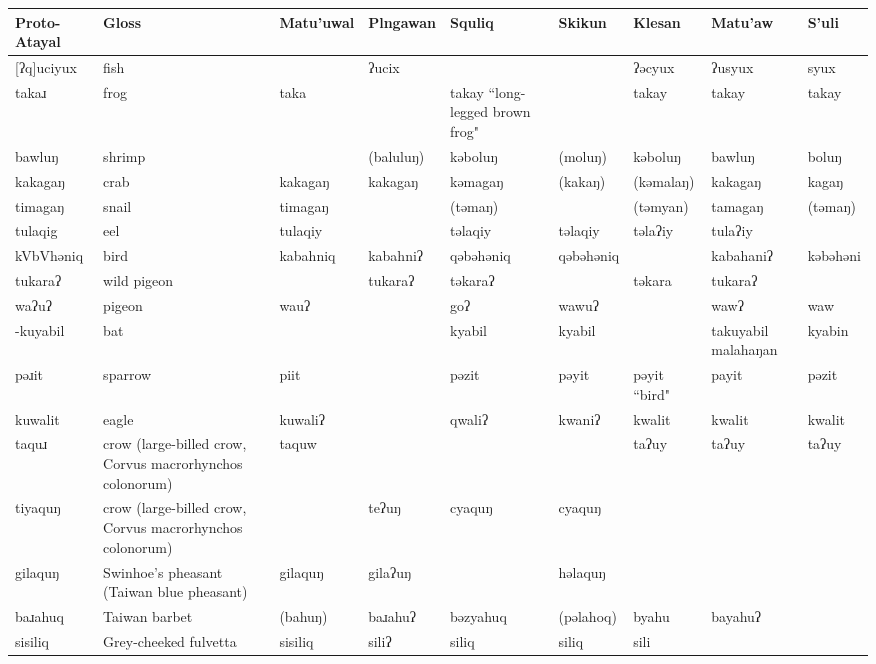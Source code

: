 
\begin{landscape}

\begin{longtable}{*{9}{p{}}}
Proto-Atayal & Gloss & Matu'uwal & Plngawan & Squliq & Skikun & Klesan & Matu'aw & S'uli\\\hline\endhead
\text{*}[ʔq]uciyux & fish &  & ʔucix &  &  & ʔəcyux & ʔusyux & syux\\
\text{*}takaɹ & frog & taka &  & takay ``long-legged brown frog" &  & takay & takay & takay\\
\text{*}bawluŋ & shrimp &  & (baluluŋ) & kəboluŋ & (moluŋ) & kəboluŋ & bawluŋ & boluŋ\\
\text{*}kakagaŋ & crab & kakagaŋ & kakagaŋ & kəmagaŋ & (kakaŋ) & (kəmalaŋ) & kakagaŋ & kagaŋ\\
\text{*}timagaŋ & snail & timagaŋ &  & (təmaŋ) &  & (təmyan) & tamagaŋ & (təmaŋ)\\
\text{*}tulaqig & eel & tulaqiy &  & təlaqiy & təlaqiy & təlaʔiy & tulaʔiy & \\
\text{*}kVbVhəniq & bird & kabahniq & kabahniʔ & qəbəhəniq & qəbəhəniq &  & kabahaniʔ & kəbəhəni\\
\text{*}tukaraʔ & wild pigeon &  & tukaraʔ & təkaraʔ &  & təkara & tukaraʔ & \\
\text{*}waʔuʔ & pigeon & wauʔ &  & goʔ & wawuʔ &  & wawʔ & waw\\
\text{*}-kuyabil & bat &  &  & kyabil & kyabil &  & takuyabil malahaŋan & kyabin\\
\text{*}pəɹit & sparrow & piit &  & pəzit & pəyit & pəyit ``bird" & payit & pəzit\\
\text{*}kuwalit & eagle & kuwaliʔ &  & qwaliʔ & kwaniʔ & kwalit & kwalit & kwalit\\
\text{*}taquɹ & crow (large-billed crow, Corvus macrorhynchos colonorum) & taquw &  &  &  & taʔuy & taʔuy & taʔuy\\
\text{*}tiyaquŋ & crow (large-billed crow, Corvus macrorhynchos colonorum) &  & teʔuŋ & cyaquŋ & cyaquŋ &  &  & \\
\text{*}gilaquŋ & Swinhoe's pheasant (Taiwan blue pheasant) & gilaquŋ & gilaʔuŋ &  & həlaquŋ &  &  & \\
\text{*}baɹahuq & Taiwan barbet & (bahuŋ) & baɹahuʔ & bəzyahuq & (pəlahoq) & byahu & bayahuʔ & \\
\text{*}sisiliq & Grey-cheeked fulvetta & sisiliq & siliʔ & siliq & siliq & sili &  & \\

\end{longtable}
\end{landscape}
